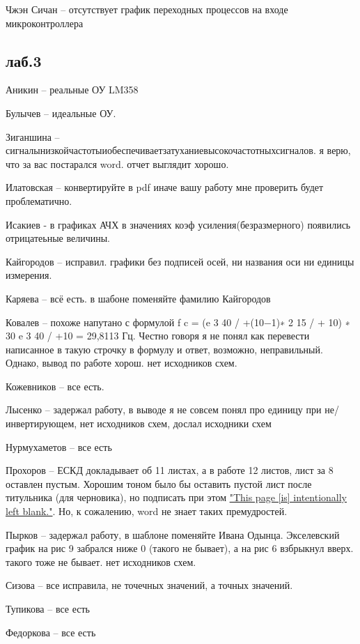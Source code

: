 \documentclass[a4paper,11pt]{article}
\begin{document}
Чжэн Сичан -- отсутствует график переходных процессов на входе микроконтроллера

\newpage
\subsection*{лаб.3}
Аникин -- реальные ОУ LM358

Булычев -- идеальные ОУ.  

Зиганшина -- сигналынизкойчастотыиобеспечиваетзатуханиевысокочастотныхсигналов. я верю, что за вас постарался word.  отчет выглядит хорошо.

Илатовская -- конвертируйте в pdf иначе вашу работу мне проверить будет проблематично.

Исакиев - в графиках АЧХ в значениях коэф усиления(безразмерного) появились отрицатеьные величины.

Кайгородов -- исправил. графики без подписей осей, ни названия оси ни единицы измерения.

Каряева -- всё есть. в шабоне поменяйте фамилию Кайгородов

Ковалев -- похоже напутано с формулой f c = (e 3 40 / +(10−1)∗ 2 15 / + 10) ∗ 30 e 3 40 / +10 = 29,8113 Гц. Честно говоря я не понял как перевести написанное в такую строчку в формулу и ответ, 
возможно, неправильный.
           Однако, вывод по работе хорош. нет исходников схем.

Кожевников -- все есть.	  

Лысенко -- задержал работу, в выводе я не совсем понял про единицу при не/инвертирующем, нет исходников схем, дослал исходники схем

Нурмухаметов -- все есть

Прохоров -- ЕСКД докладывает об 11 листах, а в работе 12 листов, лист за 8 оставлен пустым. Хорошим тоном было бы оставить пустой лист после титульника (для черновика), но подписать при этом 
\href{https://en.wikipedia.org/wiki/Intentionally_blank_page}{"This page [is] intentionally left blank."}. Но, к сожалению, word не знает таких премудростей.

Пырков -- задержал работу, в шаблоне поменяйте Ивана Одынца. Экселевский график на рис 9 забрался ниже 0 (такого не бывает), а на рис 6 взбрыкнул вверх. такого тоже не бывает.
нет исходников схем.


Сизова -- все исправила, не точечных значений, а точных значений.

Тупикова  -- все есть

Федоркова -- все есть
\end{document}
